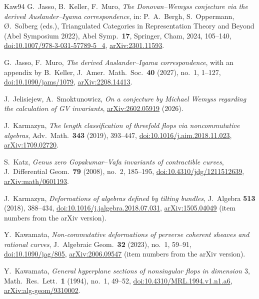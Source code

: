 \documentclass[11pt]{amsart}
\numberwithin{table}{section}
\numberwithin{figure}{section}
\numberwithin{equation}{section}
\theoremstyle{definition}
\theoremstyle{plain}
\begin{document}
\begin{thebibliography}{Kaw94}
G.~Jasso, B.~Keller, F.~Muro, \emph{The Donovan--Wemyss conjecture via the derived Auslander--Iyama correspondence}, in: P.~A.~Bergh, S.~Oppermann, {\O}.~Solberg (eds.), Triangulated Categories in Representation Theory and Beyond (Abel Symposium 2022), Abel Symp.\ \textbf{17}, Springer, Cham, 2024, 105--140, \href{https://doi.org/10.1007/978-3-031-57789-5_4}{doi:10.1007/978-3-031-57789-5\_4}, \href{https://arxiv.org/abs/2301.11593}{arXiv:2301.11593}.

G.~Jasso, F.~Muro, \emph{The derived Auslander--Iyama correspondence}, with an appendix by B.~Keller, J.\ Amer.\ Math.\ Soc.\ \textbf{40} (2027), no.~1, 1--127, \href{https://doi.org/10.1090/jams/1079}{doi:10.1090/jams/1079}, \href{https://arxiv.org/abs/2208.14413}{arXiv:2208.14413}.

J.~Jelisiejew, A.~Smoktunowicz, \emph{On a conjecture by Michael Wemyss regarding the calculation of GV invariants}, \href{https://arxiv.org/abs/2602.05919}{arXiv:2602.05919} (2026).

J.~Karmazyn, \emph{The length classification of threefold flops via noncommutative algebras}, Adv.\ Math.\ \textbf{343} (2019), 393--447, \href{https://doi.org/10.1016/j.aim.2018.11.023}{doi:10.1016/j.aim.2018.11.023}, \href{https://arxiv.org/abs/1709.02720}{arXiv:1709.02720}.

S.~Katz, \emph{Genus zero Gopakumar--Vafa invariants of contractible curves}, J.\ Differential Geom.\ \textbf{79} (2008), no.~2, 185--195, \href{https://doi.org/10.4310/jdg/1211512639}{doi:10.4310/jdg/1211512639}, \href{https://arxiv.org/abs/math/0601193}{arXiv:math/0601193}.

J.~Karmazyn, \emph{Deformations of algebras defined by tilting bundles}, J.\ Algebra \textbf{513} (2018), 388--434, \href{https://doi.org/10.1016/j.jalgebra.2018.07.031}{doi:10.1016/j.jalgebra.2018.07.031}, \href{https://arxiv.org/abs/1505.04049}{arXiv:1505.04049} (item numbers from the arXiv version).

Y.~Kawamata, \emph{Non-commutative deformations of perverse coherent sheaves and rational curves}, J.\ Algebraic Geom.\ \textbf{32} (2023), no.~1, 59--91, \href{https://doi.org/10.1090/jag/805}{doi:10.1090/jag/805}, \href{https://arxiv.org/abs/2006.09547}{arXiv:2006.09547} (item numbers from the arXiv version).

Y.~Kawamata, \emph{General hyperplane sections of nonsingular flops in dimension $3$}, Math.\ Res.\ Lett.\ \textbf{1} (1994), no.~1, 49--52, \href{https://doi.org/10.4310/MRL.1994.v1.n1.a6}{doi:10.4310/MRL.1994.v1.n1.a6}, \href{https://arxiv.org/abs/alg-geom/9310002}{arXiv:alg-geom/9310002}.


\end{thebibliography}
\end{document}
